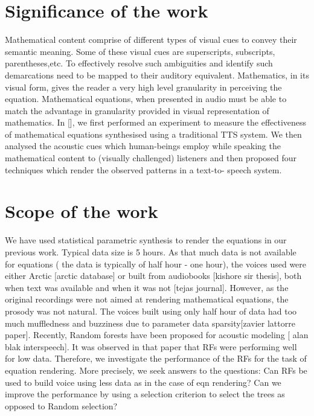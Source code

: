 \documentclass{acm_proc_article-sp}
\begin{document}
\section{Significance of the work}
Mathematical content comprise of different types of visual cues to convey their semantic meaning. Some of these visual cues are superscripts, subscripts, parentheses,etc.  To effectively resolve such ambiguities and identify such demarcations need to be mapped to their auditory equivalent. Mathematics, in its visual form, gives the reader a very high level granularity in perceiving the equation. Mathematical equations, when presented in audio must be able to match the advantage in granularity provided in visual representation of mathematics.  In [], we first performed an experiment to measure the effectiveness of mathematical equations synthesised  using a traditional TTS system. We then analysed the acoustic cues which human-beings employ while speaking the mathematical content to (visually challenged) listeners and then proposed four techniques which render the observed patterns in a text-to- speech system.  

\section{Scope of the work}
We have used statistical parametric synthesis to render the equations in our previous work. Typical data size is 5 hours. As that much data is not available for equations ( the data is typically of half hour - one hour), the voices used were either Arctic [arctic database] or built from audiobooks [kishore sir thesis], both when text was available and when it was not [tejas journal].  However, as the original recordings were not aimed at rendering mathematical equations, the prosody was not natural. The voices built using only half hour of data had too much muffledness and buzziness due to parameter data sparsity[zavier lattorre paper]. Recently, Random forests have been proposed for acoustic modeling [ alan blak interspeech]. It was observed in that paper that RFs were performing well for low data. Therefore, we investigate the performance of the RFs for the task of equation rendering. More precisely, we seek answers to the questions: Can RFs be used to build voice using less data as in the case of eqn rendering? Can we improve the performance by using a selection criterion to select the trees as opposed to Random selection? 
\end{document}
